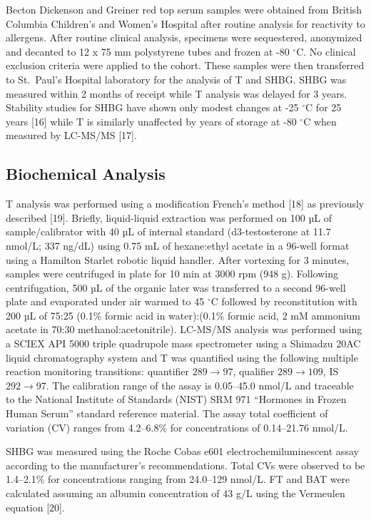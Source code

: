 \documentclass[]{elsarticle} %
\begin{document}
Becton Dickenson and Greiner red top serum samples were obtained from
British Columbia Children's and Women's Hospital after routine analysis
for reactivity to allergens. After routine clinical analysis, specimens
were sequestered, anonymized and decanted to 12 x 75 mm polystyrene
tubes and frozen at -80 \(^{\circ}\)C. No clinical exclusion criteria
were applied to the cohort. These samples were then transferred to
St.~Paul's Hospital laboratory for the analysis of T and SHBG. SHBG was
measured within 2 months of receipt while T analysis was delayed for 3
years. Stability studies for SHBG have shown only modest changes at -25
\(^{\circ}\)C for 25 years {[}16{]} while T is similarly unaffected by
years of storage at -80 \(^{\circ}\)C when measured by LC-MS/MS
{[}17{]}.

\hypertarget{biochemical-analysis}{%
\subsection{Biochemical Analysis}\label{biochemical-analysis}}

T analysis was performed using a modification French's method {[}18{]}
as previously described {[}19{]}. Briefly, liquid-liquid extraction was
performed on 100 µL of sample/calibrator with 40 µL of internal standard
(d3-testosterone at 11.7 nmol/L; 337 ng/dL) using 0.75 mL of
hexane:ethyl acetate in a 96-well format using a Hamilton Starlet
robotic liquid handler. After vortexing for 3 minutes, samples were
centrifuged in plate for 10 min at 3000 rpm (948 g). Following
centrifugation, 500 µL of the organic later was transferred to a second
96-well plate and evaporated under air warmed to 45 \(^{\circ}\)C
followed by reconstitution with 200 µL of 75:25 (0.1\% formic acid in
water):(0.1\% formic acid, 2 mM ammonium acetate in 70:30
methanol:acetonitrile). LC-MS/MS analysis was performed using a SCIEX
API 5000 triple quadrupole mass spectrometer using a Shimadzu 20AC
liquid chromatography system and T was quantified using the following
multiple reaction monitoring transitions: quantifier \(289 \to 97\),
qualifier \(289 \to 109\), IS \(292 \to 97\). The calibration range of
the assay is 0.05--45.0 nmol/L and traceable to the National Institute
of Standards (NIST) SRM 971 ``Hormones in Frozen Human Serum'' standard
reference material. The assay total coefficient of variation (CV) ranges
from 4.2--6.8\% for concentrations of 0.14--21.76 nmol/L.

SHBG was measured using the Roche Cobas e601 electrochemiluminescent
assay according to the manufacturer's recommendations. Total CVs were
observed to be 1.4--2.1\% for concentrations ranging from 24.0--129
nmol/L. FT and BAT were calculated assuming an albumin concentration of
43 g/L using the Vermeulen equation {[}20{]}.
\end{document}

